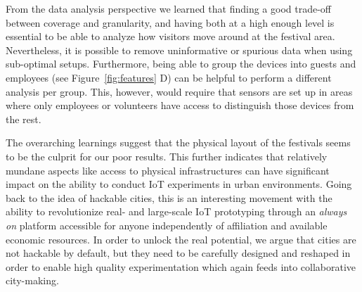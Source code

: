 From the data analysis perspective we learned that finding a good trade-off between coverage and granularity, and having both at a high enough level is essential to be able to analyze how visitors move around at the festival area. Nevertheless, it is possible to remove uninformative or spurious data when using sub-optimal setups. Furthermore, being able to group the devices into guests and employees (see Figure~\ref{fig:features} D) can be helpful to perform a different analysis per group. This, however, would require that sensors are set up in areas where only employees or volunteers have access to distinguish those devices from the rest.

The overarching learnings suggest that the physical layout of the festivals seems to be the culprit for our poor results. This further indicates that relatively mundane aspects like access to physical infrastructures can have significant impact on the ability to conduct IoT experiments in urban environments. Going back to the idea of hackable cities, this is an interesting movement with the ability to revolutionize real- and large-scale IoT prototyping through an \textit{always on} platform accessible for anyone independently of affiliation and available economic resources. In order to unlock the real potential, we argue that cities are not hackable by default, but they need to be carefully designed and reshaped in order to enable high quality experimentation which again feeds into collaborative city-making.